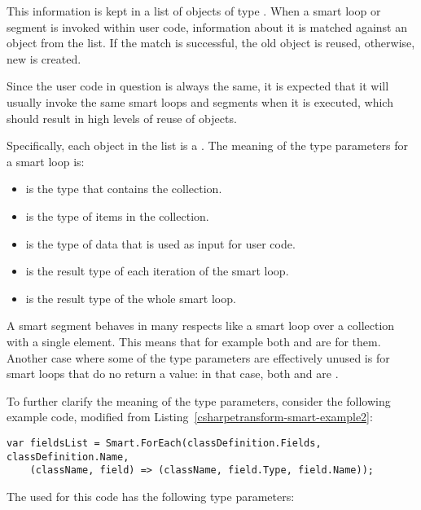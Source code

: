 \medskip

This information is kept in a list of objects of type . When a smart loop or segment is invoked within user code, information about it is matched against an object from the list. If the match is successful, the old object is reused, otherwise, new  is created.

Since the user code in question is always the same, it is expected that it will usually invoke the same smart loops and segments when it is executed, which should result in high levels of reuse of  objects.

Specifically, each object in the list is a . The meaning of the type parameters for a smart loop is:

\begin{itemize}
\item {} is the type that contains the collection.
\item {} is the type of items in the collection.
\item {} is the type of data that is used as input for user code.
\item {} is the result type of each iteration of the smart loop.
\item {} is the result type of the whole smart loop.
\end{itemize}

\pagebreak[2]

A smart segment behaves in many respects like a smart loop over a collection with a single element. This means that for example both  and  are  for them. Another case where some of the type parameters are effectively unused is for smart loops that do no return a value: in that case, both  and  are .

To further clarify the meaning of the type parameters, consider the following example code, modified from Listing~\ref{csharpetransform-smart-example2}:

\begin{verbatim}
var fieldsList = Smart.ForEach(classDefinition.Fields, classDefinition.Name,
    (className, field) => (className, field.Type, field.Name));
\end{verbatim}

The  used for this code has the following type parameters:

